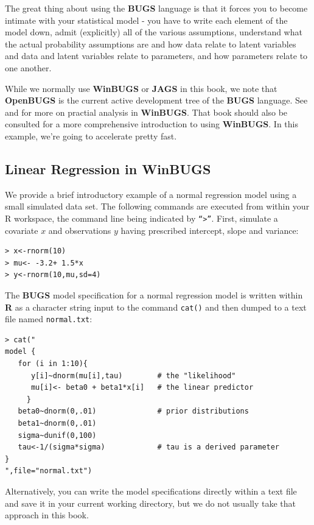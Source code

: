 The great thing about using the {\bf BUGS} language is that it forces
you to become intimate with your statistical model - you have to write
each element of the model down, admit (explicitly) all of the various
assumptions, understand what the actual probability assumptions are
and how data relate to latent variables and data and latent variables
relate to parameters, and how parameters relate to one another. 

While we normally use
{\bf WinBUGS} or {\bf JAGS} in this book, we note that {\bf
 OpenBUGS} is the current active development tree of the {\bf BUGS}
language. See \citet[][ch.xyz]{kery:2010} and 
\citet[][appendix xyz]{kery_schaub:2011} for more on practial analysis
in {\bf WinBUGS}.
That book should also be consulted
for a more comprehensive introduction to using {\bf WinBUGS}. In this
example, we're going to accelerate pretty fast.

\subsection{Linear Regression in WinBUGS}

We provide a brief introductory example of a normal regression model
using a small simulated data set. The following commands are executed
from within your R workspace, the command line being indicated by
\mbox{\tt ``>''}. First, simulate a covariate $x$ and observations $y$ having
prescribed intercept, slope and variance:
\begin{verbatim}
> x<-rnorm(10)
> mu<- -3.2+ 1.5*x
> y<-rnorm(10,mu,sd=4)
\end{verbatim}
The {\bf BUGS} model specification for a normal regression model is
written within {\bf R} as a character string input to the command
\mbox{\tt cat()} and
then dumped to a text file named \mbox{\tt normal.txt}:
\begin{verbatim}
> cat("
model {
   for (i in 1:10){
      y[i]~dnorm(mu[i],tau)        # the "likelihood"
      mu[i]<- beta0 + beta1*x[i]   # the linear predictor
     }
   beta0~dnorm(0,.01)              # prior distributions
   beta1~dnorm(0,.01)
   sigma~dunif(0,100)               
   tau<-1/(sigma*sigma)            # tau is a derived parameter
}
",file="normal.txt")
\end{verbatim}
Alternatively, you
can write the model specifications directly within a text file and
save it in your current working directory, but we do not usually take
that approach in this book.

